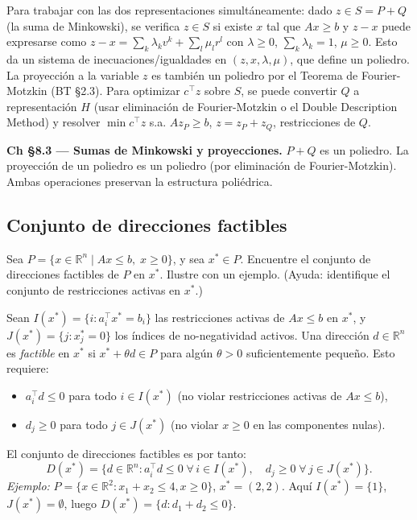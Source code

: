 \documentclass[12pt]{article}
\theoremstyle{plain}
\begin{document}
\begin{solucion}

Para trabajar con las dos representaciones simultáneamente: dado $z \in S = P + Q$ (la suma de Minkowski), se verifica $z \in S$ si existe $x$ tal que $Ax \geq b$ y $z - x$ puede expresarse como $z - x = \sum_k \lambda_k v^k + \sum_l \mu_l r^l$ con $\lambda \geq 0$, $\sum_k \lambda_k = 1$, $\mu \geq 0$. Esto da un sistema de inecuaciones/igualdades en $(z, x, \lambda, \mu)$, que define un poliedro. La proyección a la variable $z$ es también un poliedro por el Teorema de Fourier-Motzkin (BT §2.3). Para optimizar $c^\top z$ sobre $S$, se puede convertir $Q$ a representación $H$ (usar eliminación de Fourier-Motzkin o el Double Description Method) y resolver $\min c^\top z$ s.a. $Az_P \geq b$, $z = z_P + z_Q$, restricciones de $Q$.

\end{solucion}

\begin{teofund}
\textbf{Ch §8.3 — Sumas de Minkowski y proyecciones.} $P+Q$ es un poliedro. La proyección de un poliedro es un poliedro (por eliminación de Fourier-Motzkin). Ambas operaciones preservan la estructura poliédrica.
\end{teofund}

\bigskip

\subsection{Conjunto de direcciones factibles}

Sea $P = \{x \in \mathbb{R}^n \mid Ax \leq b,\; x \geq 0\}$, y sea $x^* \in P$. Encuentre
el conjunto de direcciones factibles de $P$ en $x^*$. Ilustre con un ejemplo.
(Ayuda: identifique el conjunto de restricciones activas en $x^*$.)

\begin{solucion}

Sean $I(x^*) = \{i : a_i^\top x^* = b_i\}$ las restricciones activas de $Ax \leq b$ en $x^*$, y $J(x^*) = \{j : x^*_j = 0\}$ los índices de no-negatividad activos. Una dirección $d \in \mathbb{R}^n$ es \emph{factible} en $x^*$ si $x^* + \theta d \in P$ para algún $\theta > 0$ suficientemente pequeño. Esto requiere:
\begin{itemize}
      \item $a_i^\top d \leq 0$ para todo $i \in I(x^*)$ (no violar restricciones activas de $Ax \leq b$),
      \item $d_j \geq 0$ para todo $j \in J(x^*)$ (no violar $x \geq 0$ en las componentes nulas).
\end{itemize}
El conjunto de direcciones factibles es por tanto:
\[
D(x^*) = \{d \in \mathbb{R}^n : a_i^\top d \leq 0 \;\forall\, i \in I(x^*),\quad d_j \geq 0 \;\forall\, j \in J(x^*)\}.
\]
\textit{Ejemplo:} $P = \{x \in \mathbb{R}^2 : x_1 + x_2 \leq 4, x \geq 0\}$, $x^* = (2,2)$. Aquí $I(x^*) = \{1\}$, $J(x^*) = \emptyset$, luego $D(x^*) = \{d : d_1 + d_2 \leq 0\}$.

\end{solucion}
\end{document}
